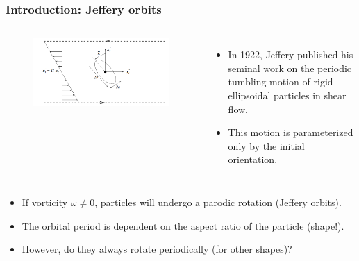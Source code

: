 \documentclass{beamer}
\newcommand{\bi}{\begin{itemize}}
\newcommand{\ei}{\end{itemize}}
\begin{document}
\begin{frame}
	\frametitle{Introduction: Jeffery orbits}
	\begin{overlayarea}{\textwidth}{\textheight}
		\vspace{-0.2cm}
	\begin{columns}
	\begin{figure}[htb]
		\begin{center}
			\includegraphics[width=1\textwidth]{plots/jeffery.png}
		\end{center}
	\end{figure}
	\small
	\bi
	\item In 1922, Jeffery published his seminal work on the periodic tumbling motion of rigid ellipsoidal particles in shear flow.
	\item This motion is parameterized only by the initial orientation.
	\ei 
\end{columns}
\vspace{0.5cm}
\bi
\item If vorticity $\omega\neq 0$, particles will undergo a parodic rotation (Jeffery orbits).
	\item The orbital period is dependent on the aspect ratio of the particle (shape!).
\item However, do they always rotate periodically (for other shapes)?
\ei
	\end{overlayarea}
\end{frame}

\end{document}
